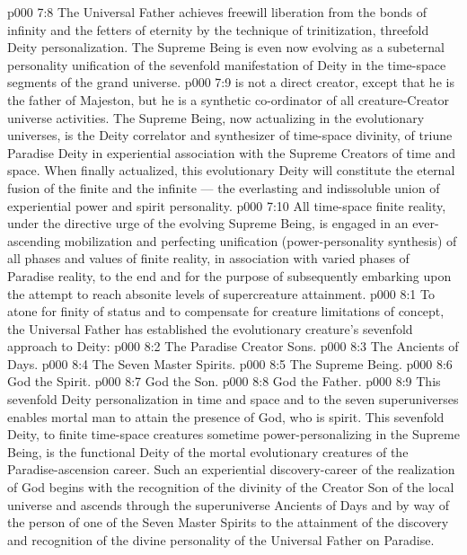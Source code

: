 \vs p000 7:8 The Universal Father achieves freewill liberation from the bonds of infinity and the fetters of eternity by the technique of trinitization, threefold Deity personalization. The Supreme Being is even now evolving as a subeternal personality unification of the sevenfold manifestation of Deity in the time\hyp{}space segments of the grand universe.
\vs p000 7:9 \pc {} is not a direct creator, except that he is the father of Majeston, but he is a synthetic co\hyp{}ordinator of all creature\hyp{}Creator universe activities. The Supreme Being, now actualizing in the evolutionary universes, is the Deity correlator and synthesizer of time\hyp{}space divinity, of triune Paradise Deity in experiential association with the Supreme Creators of time and space. When finally actualized, this evolutionary Deity will constitute the eternal fusion of the finite and the infinite --- the everlasting and indissoluble union of experiential power and spirit personality.
\vs p000 7:10 All time\hyp{}space finite reality, under the directive urge of the evolving Supreme Being, is engaged in an ever\hyp{}ascending mobilization and perfecting unification (power\hyp{}personality synthesis) of all phases and values of finite reality, in association with varied phases of Paradise reality, to the end and for the purpose of subsequently embarking upon the attempt to reach absonite levels of supercreature attainment.
\vs p000 8:1 To atone for finity of status and to compensate for creature limitations of concept, the Universal Father has established the evolutionary creature’s sevenfold approach to Deity:
\vs p000 8:2 \bibnobreakspace The Paradise Creator Sons.
\vs p000 8:3 \bibnobreakspace The Ancients of Days.
\vs p000 8:4 \bibnobreakspace The Seven Master Spirits.
\vs p000 8:5 \bibnobreakspace The Supreme Being.
\vs p000 8:6 \bibnobreakspace God the Spirit.
\vs p000 8:7 \bibnobreakspace God the Son.
\vs p000 8:8 \bibnobreakspace God the Father.
\vs p000 8:9 \pc This sevenfold Deity personalization in time and space and to the seven superuniverses enables mortal man to attain the presence of God, who is spirit. This sevenfold Deity, to finite time\hyp{}space creatures sometime power\hyp{}personalizing in the Supreme Being, is the functional Deity of the mortal evolutionary creatures of the Paradise\hyp{}ascension career. Such an experiential discovery\hyp{}career of the realization of God begins with the recognition of the divinity of the Creator Son of the local universe and ascends through the superuniverse Ancients of Days and by way of the person of one of the Seven Master Spirits to the attainment of the discovery and recognition of the divine personality of the Universal Father on Paradise.

